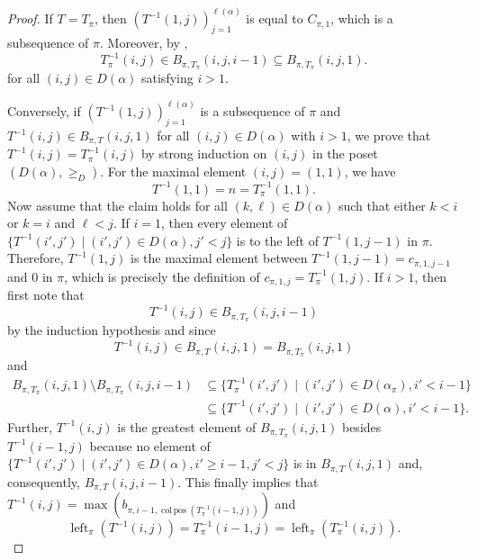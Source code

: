 \documentclass[12pt]{amsart}
\DeclareMathOperator{\colpos}{col\,pos}
\DeclareMathOperator{\leftof}{left}
\theoremstyle{definition}
\begin{document}
\begin{proof}
If $T=T_{\pi}$, then $(T^{-1}(1,j))_{j=1}^{\ell(\alpha)}$ is equal to $C_{\pi, 1}$, which is a subsequence of $\pi$. Moreover, by ,
\[T_{\pi}^{-1}(i,j)\in B_{\pi,T_{\pi}}(i,j,i-1)\subseteq B_{\pi,T_{\pi}}(i,j,1).\]
for all $(i,j)\in D(\alpha)$ satisfying $i>1$.

Conversely, if $(T^{-1}(1,j))_{j=1}^{\ell(\alpha)}$ is a subsequence of $\pi$ and $T^{-1}(i,j)\in B_{\pi,T}(i,j,1)$ for all $(i,j)\in D(\alpha)$ with $i>1$, we prove that $T^{-1}(i,j)=T^{-1}_{\pi}(i,j)$ by strong induction on $(i,j)$ in the poset $(D(\alpha),\ge_{D})$. For the maximal element $(i,j)=(1,1)$, we have 
\[T^{-1}(1,1)=n=T_{\pi}^{-1}(1,1).\]
Now assume that the claim holds for all $(k,\ell)\in D(\alpha)$ such that either $k<i$ or $k=i$ and $\ell < j$.  If $i=1$, then every element of $\{T^{-1}(i',j')\mid (i',j')\in D(\alpha), j'<j\}$ is to the left of $T^{-1}(1,j-1)$ in $\pi$. Therefore, $T^{-1}(1,j)$ is the maximal element between $T^{-1}(1,j-1)=c_{\pi,1,j-1}$ and $0$ in $\pi$, which is precisely the definition of $c_{\pi,1,j}=T_{\pi}^{-1}(1,j)$. If $i>1$, then first note that
\[T^{-1}(i,j) \in B_{\pi,T_{\pi}}(i,j,i-1)\]
by the induction hypothesis and  since
\[T^{-1}(i,j)\in B_{\pi,T}(i,j,1) = B_{\pi,T_{\pi}}(i,j,1)\]
and
\begin{align*}
B_{\pi,T_{\pi}}(i,j,1) \setminus B_{\pi,T_{\pi}}(i,j,i-1)&\subseteq \{T_{\pi}^{-1}(i',j')\mid (i',j')\in D(\alpha_{\pi}), i'<i-1\} \\
&\subseteq \{T^{-1}(i',j')\mid (i',j')\in D(\alpha), i'<i-1\}.
\end{align*}
Further, $T^{-1}(i,j)$ is the greatest element of $B_{\pi,T_{\pi}}(i,j,1)$ besides $T^{-1}(i-1,j)$ because no element of $\{T^{-1}(i',j')\mid (i',j')\in D(\alpha), i'\ge i-1,j'<j\}$ is in $B_{\pi,T}(i,j,1)$ and, consequently, $B_{\pi,T}(i,j,i-1)$. This finally implies that $T^{-1}(i,j)=\max(b_{\pi,i-1,\colpos(T^{-1}_{\pi}(i-1,j))})$ and \[\leftof_{\pi}(T^{-1}(i,j))=T^{-1}_{\pi}(i-1,j)=\leftof_{\pi}(T^{-1}_{\pi}(i,j)).\]
\end{proof}
\end{document}
